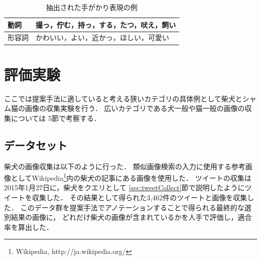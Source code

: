 \documentclass{deimj}
\begin{document}
\begin{table}[bt]
\begin{center}
\caption{抽出された手がかり表現の例}
\label{tab:predicate}
\begin{tabular}{|l|l|}\hline
動詞& 撮っ，佇む，持っ，する，たつ，吠え，飼い \\ \hline
形容詞& かわいい，よい，近かっ，ほしい，可愛い \\ \hline
\end{tabular}
\end{center}
\end{table}



\section{評価実験}
\label{sec:experiment}

ここでは提案手法に適していると考える狭いカテゴリの具体例として柴犬とシャム猫の画像の収集実験を行う．
広いカテゴリである犬一般や猫一般の画像の収集については
5節で考察する．

\subsection{データセット}


柴犬の画像収集は以下のように行った．
類似画像検索の入力に使用する参考画像としてWikipedia\footnote{Wikipedia, http://ja.wikipedia.org/}内の柴犬の記事にある画像を使用した．
ツイートの収集は2015年1月27日に，柴犬をクエリとして
\ref{sec:tweetCollect}節で説明したようにツイートを収集した．
その結果として得られた3,462件のツイートと画像を収集した．
このデータ群を提案手法でアノテーションすることで得られる最終的な選別結果の画像に，
どれだけ柴犬の画像が含まれているかを人手で評価し，適合率を算出した．
\end{document}
